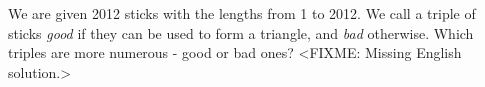 \problem
We are given 2012 sticks with the lengths from 1 to 2012.
We call a triple of sticks \emph{good} if they can be used to form a triangle,
and \emph{bad} otherwise.
Which triples are more numerous - good or bad ones?
\solution
<FIXME: Missing English solution.>
\endproblem
